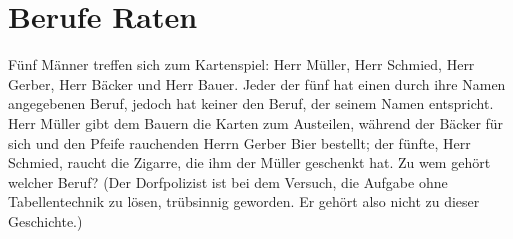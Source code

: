 \section{Berufe Raten}

Fünf Männer treffen sich zum Kartenspiel: Herr Müller, Herr Schmied, Herr
Gerber, Herr Bäcker und Herr
Bauer. Jeder der fünf hat einen durch ihre Namen
angegebenen Beruf, jedoch hat keiner den Beruf, der seinem Namen entspricht.
Herr Müller gibt dem Bauern die Karten zum Austeilen, während der Bäcker für
sich und den Pfeife rauchenden Herrn Gerber Bier bestellt; der fünfte, Herr
Schmied, raucht die Zigarre, die ihm der Müller geschenkt hat. Zu wem gehört
welcher Beruf? (Der Dorfpolizist ist bei dem Versuch, die Aufgabe ohne
Tabellentechnik zu lösen, trübsinnig geworden. Er gehört also nicht zu dieser
Geschichte.)

\TNTeop{}


